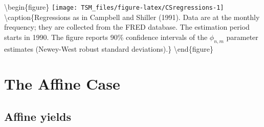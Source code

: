 \documentclass[
  12pt,
]{book}
\theoremstyle{definition}
\theoremstyle{definition}
\theoremstyle{definition}
\theoremstyle{definition}
\theoremstyle{remark}
\begin{document}
\textbackslash begin\{figure\}
\texttt{[image: TSM\_files/figure-latex/CSregressions-1]} \textbackslash caption\{Regressions as in Campbell and Shiller (1991). Data are at the monthly frequency; they are collected from the FRED database. The estimation period starts in 1990. The figure reports 90\% confidence intervals of the \(\phi_{n,m}\) parameter estimates (Newey-West robust standard deviations).\}\label{fig:CSregressions}
\textbackslash end\{figure\}

\hypertarget{RiskFreeAffine}{%
\section{The Affine Case}\label{RiskFreeAffine}}

\hypertarget{affine-yields}{%
\subsection{Affine yields}\label{affine-yields}}
\end{document}
